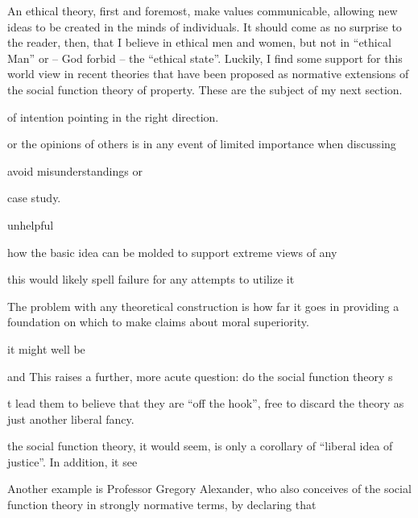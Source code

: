 An ethical theory, first and foremost, make values communicable, allowing new ideas to be created in the minds of individuals. It should come as no surprise to the reader, then, that I believe in ethical men and women, but not in ``ethical Man'' or -- God forbid --  the ``ethical state''. Luckily, I find some support for this world view in recent theories that have been proposed as normative extensions of the social function theory of property. These are the subject of my next section.



of intention   pointing in the right direction. 


or the opinions of others is in any event of limited importance when discussing 


avoid misunderstandings or



case study. 





























unhelpful 

 how the basic idea can be molded to support extreme views of any 


this would likely spell failure for any attempts to utilize it




The problem with any theoretical construction is how far it goes in providing a foundation on which to make claims about moral superiority. 


it might well be 


and
This raises a further, more acute question: do the social function theory s




t lead them to believe that they are ``off the hook'', free to discard the theory as just another liberal fancy.

 the social function theory, it would seem, is only a corollary of ``liberal idea of justice''. In addition, it see


Another example is Professor Gregory Alexander, who also conceives of the social function theory in strongly normative terms, by declaring that 



